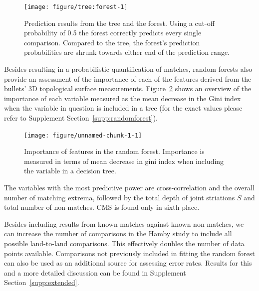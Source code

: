 \documentclass[aoas, preprint]{imsart}\usepackage[]{graphicx}\usepackage[]{color}
\newenvironment{knitrout}{}{} %
\begin{document}
\begin{figure}[hbtp]
  \centering
\begin{knitrout}
\color{fgcolor}
\texttt{[image: figure/tree:forest-1]} 

\end{knitrout}
\caption{\label{fig:tree-forest}Prediction results from the tree and the forest. Using a cut-off probability of 0.5 the forest correctly predicts every single comparison. Compared to the tree, the forest's prediction probabilities are  shrunk towards either end of the prediction range. }
\end{figure}

Besides resulting in a probabilistic quantification of matches, random forests also provide an assessment of the importance of each of the features derived from the bullets' 3D topological surface measurements. Figure~\ref{fig:importance} shows an overview of the importance of each variable measured as the mean decrease in the Gini index when the variable in question is included in a tree (for the exact values please refer to Supplement Section~\ref{supp:randomforest}). 
\begin{figure}
\begin{knitrout}
\color{fgcolor}
\texttt{[image: figure/unnamed-chunk-1-1]} 

\end{knitrout}
\caption{\label{fig:importance}Importance of features in the random forest. Importance is measured in terms of mean decrease in gini index when including the variable in a decision tree.}
\end{figure}


The variables with the most predictive power are cross-correlation and the overall number of matching extrema, followed by the total depth of joint striations $S$ and total number of non-matches. CMS is found only in sixth place.

Besides including results from known matches against known non-matches, we can increase the number of comparisons in the Hamby study to include all possible land-to-land comparisons. This effectively doubles the number of data points available. Comparisons not previously included in fitting the random forest can also be used as an additional source for assessing error rates.  Results for this and a more detailed discussion can be found in Supplement Section~\ref{supp:extended}.
\end{document}
